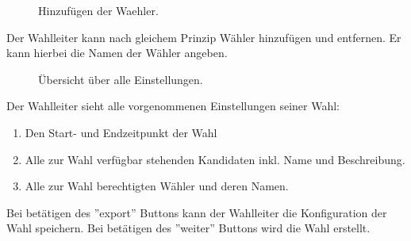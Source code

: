 \documentclass[parskip=full,11pt,twoside]{scrartcl}
\begin{document}
\begin{figure}[H]
	\caption{\label{fig:wlltr-voter}
		Hinzufügen der \gls{Waehler}.
	}
\end{figure}
Der Wahlleiter kann nach gleichem Prinzip Wähler hinzufügen und entfernen.
Er kann hierbei die Namen der Wähler angeben.

\begin{figure}[H]
	\caption{\label{fig:wlltr-done}
		Übersicht über alle Einstellungen.
	}
\end{figure}
Der Wahlleiter sieht alle vorgenommenen Einstellungen seiner Wahl:
\begin{enumerate}
	\item Den Start- und Endzeitpunkt der Wahl
	\item Alle zur Wahl verfügbar stehenden Kandidaten inkl. Name und Beschreibung.
	\item Alle zur Wahl berechtigten Wähler und deren Namen.
\end{enumerate}
Bei betätigen des ''export'' Buttons kann der Wahlleiter die Konfiguration der Wahl speichern.
Bei betätigen des ''weiter'' Buttons wird die Wahl erstellt.
\end{document}
